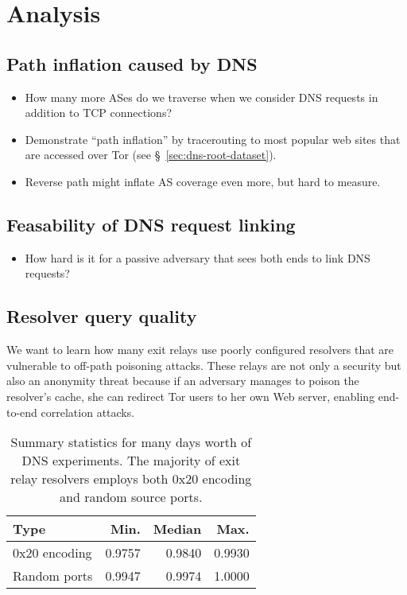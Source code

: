 \section{Analysis}
\label{sec:analysis}

\subsection{Path inflation caused by DNS}
\begin{itemize}
	\item How many more ASes do we traverse when we consider DNS requests in
		addition to TCP connections?
	\item Demonstrate ``path inflation'' by tracerouting to most popular web
		sites that are accessed over Tor (see \S~\ref{sec:dns-root-dataset}).
	\item Reverse path might inflate AS coverage even more, but hard to measure.
\end{itemize}

\subsection{Feasability of DNS request linking}
\begin{itemize}
	\item How hard is it for a passive adversary that sees both ends to link DNS
		requests?
\end{itemize}

\subsection{Resolver query quality}
We want to learn how many exit relays use poorly configured resolvers that are
vulnerable to off-path poisoning attacks.  These relays are not only a security
but also an anonymity threat because if an adversary manages to poison the
resolver's cache, she can redirect Tor users to her own Web server, enabling
end-to-end correlation attacks.

\begin{table}[t]
	\centering
	\begin{tabular}{l r r r}
	\toprule
	\textbf{Type} & \textbf{Min.} & \textbf{Median} & \textbf{Max.} \\
	\midrule
	0x20 encoding & 0.9757 & 0.9840 & 0.9930 \\
	Random ports & 0.9947 & 0.9974 & 1.0000 \\
	\bottomrule
	\end{tabular}
	\caption{Summary statistics for many days worth of DNS experiments.  The
	majority of exit relay resolvers employs both 0x20 encoding and random
	source ports.}
	\label{tab:query-quality}
\end{table}
